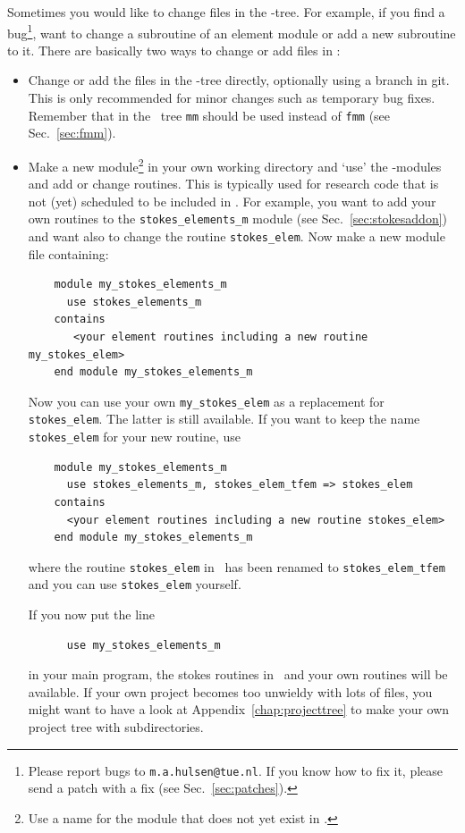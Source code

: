 Sometimes you would like to change files in the \tfem-tree.
For example,
if you find a bug\footnote{Please report bugs to \texttt{m.a.hulsen@tue.nl}. If you know how to fix it, please send a patch with a
 fix (see Sec.~\ref{sec:patches}).}, want to change a subroutine of an element module or add a
new subroutine to it.
There are basically two ways to change or add files in \tfem:
\begin{itemize}
   \item Change or add the files in the \tfem-tree directly, optionally using a branch in git.
         This is only recommended for minor changes such as temporary bug fixes. Remember that in the \tfem\ tree \texttt{mm} should be used instead of \texttt{fmm} (see Sec.~\ref{sec:fmm}).
   \item Make a new module\footnote{Use a name for the module that does not yet exist in \tfem.} in your own working directory and `use' the
         \tfem-modules and add or change routines. This is typically used for
         research code that is not (yet) scheduled to be included in \tfem.
         For example, you want to add your own routines to the
         \texttt{stokes\_elements\_m} module (see
         Sec.~\ref{sec:stokesaddon}) and want also to change 
         the routine \texttt{stokes\_elem}. Now make a new module file
         containing:  
\begin{verbatim}
    module my_stokes_elements_m
      use stokes_elements_m
    contains              
       <your element routines including a new routine my_stokes_elem>       
    end module my_stokes_elements_m
\end{verbatim}
         Now you can use your own \texttt{my\_stokes\_elem} as a replacement for
         \texttt{stokes\_elem}. The latter is still available. If you want to keep the name
         \texttt{stokes\_elem} for your new routine, use
\begin{verbatim}
    module my_stokes_elements_m
      use stokes_elements_m, stokes_elem_tfem => stokes_elem
    contains              
      <your element routines including a new routine stokes_elem>   
    end module my_stokes_elements_m
\end{verbatim}
    where the routine \texttt{stokes\_elem} in \tfem\
         has been renamed to \texttt{stokes\_elem\_tfem} and you can use \texttt{stokes\_elem} yourself.
         
    If you now put the line 
\begin{verbatim}
      use my_stokes_elements_m
\end{verbatim}
    in your main program, the stokes routines in \tfem\ and your own
         routines will be available. 
    If your own project becomes too unwieldy with lots of files, you might want to have a look at Appendix~\ref{chap:projecttree} to make your own project tree with subdirectories.
 
\end{itemize}
\newpage
